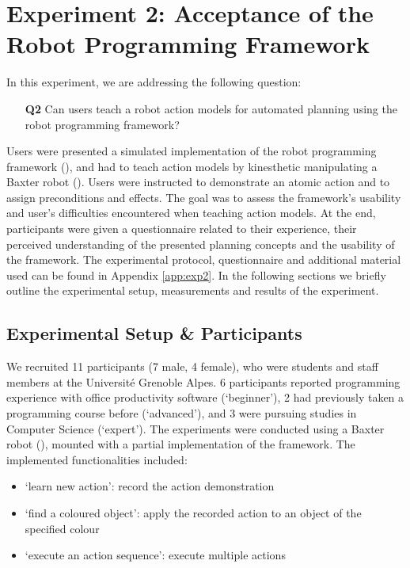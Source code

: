 \section{Experiment 2: Acceptance of the Robot Programming Framework}
\label{sec:Exp2}

In this experiment, we are addressing the following question:

\begin{enumerate}
  \item[\textbf{Q2}] Can users teach a robot action models for automated planning using the robot programming framework?
\end{enumerate}
\begin{sloppypar}
Users were presented a simulated implementation of the robot programming framework (), and had to teach action models by kinesthetic manipulating a Baxter robot (). 
Users were instructed to demonstrate an atomic action and to assign preconditions and effects.
The goal was to assess the framework's usability and user's difficulties encountered when teaching action models.
At the end, participants were given a questionnaire related to their experience, their perceived understanding of the presented planning concepts and the usability of the framework.
The experimental protocol, questionnaire and additional material used can be found in Appendix \ref{app:exp2}.
In the following sections we briefly outline the experimental setup, measurements and results of the experiment.
\end{sloppypar}

\subsection{Experimental Setup \& Participants}
We recruited 11 participants (7 male, 4 female), who were students and staff members at the Universit\'{e} Grenoble Alpes. 
6 participants reported programming experience with office productivity software (`beginner'), 2 had previously taken a programming course before (`advanced'), and 3 were pursuing studies in Computer Science (`expert').
The experiments were conducted using a Baxter robot (), mounted with a partial implementation of the framework.
The implemented functionalities included:
\begin{itemize}
	\item `learn new action': record the action demonstration
	\item `find a coloured object': apply the recorded action to an object of the specified colour
	\item `execute an action sequence': execute multiple actions
\end{itemize}

